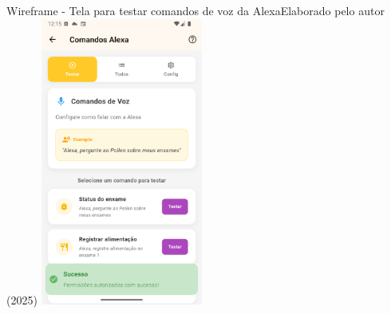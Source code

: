 \begin{figura}{Wireframe - Tela para testar comandos de voz da Alexa}{Elaborado pelo autor (2025)}
  \centering
  \includegraphics[width=0.4\textwidth]{resources/floats/ilustracoes/testar_comandos_alexa_wireframe.png}
  \label{fig:wireframe-testar-comandos}
\end{figura}
